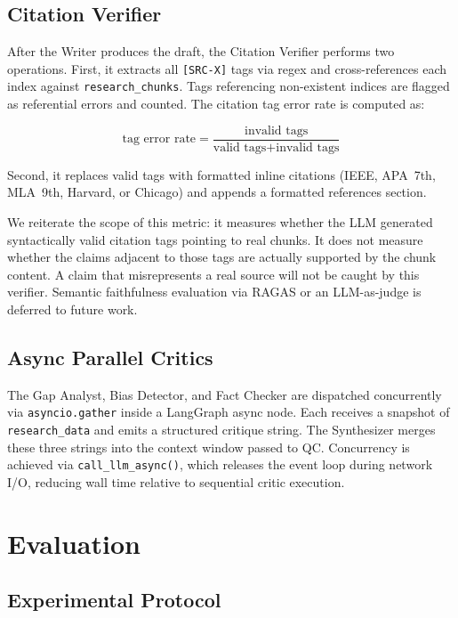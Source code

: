 \documentclass[11pt]{article}
\begin{document}
\subsection{Citation Verifier}

After the Writer produces the draft, the Citation Verifier performs two
operations. First, it extracts all \texttt{[SRC-X]} tags via regex and
cross-references each index against \texttt{research\_chunks}. Tags referencing
non-existent indices are flagged as referential errors and counted. The citation
tag error rate is computed as:

\[
\text{tag error rate} = \frac{\text{invalid tags}}{\text{valid tags} + \text{invalid tags}}
\]

Second, it replaces valid tags with formatted inline citations (IEEE, APA~7th,
MLA~9th, Harvard, or Chicago) and appends a formatted references section.

We reiterate the scope of this metric: it measures whether the LLM generated
syntactically valid citation tags pointing to real chunks. It does not measure
whether the claims adjacent to those tags are actually supported by the chunk
content. A claim that misrepresents a real source will not be caught by this
verifier. Semantic faithfulness evaluation via RAGAS or an LLM-as-judge is
deferred to future work.

\subsection{Async Parallel Critics}

The Gap Analyst, Bias Detector, and Fact Checker are dispatched concurrently via
\texttt{asyncio.gather} inside a LangGraph async node. Each receives a snapshot
of \texttt{research\_data} and emits a structured critique string. The
Synthesizer merges these three strings into the context window passed to QC.
Concurrency is achieved via \texttt{call\_llm\_async()}, which releases the
event loop during network I/O, reducing wall time relative to sequential critic
execution.

\section{Evaluation}

\subsection{Experimental Protocol}
\end{document}
